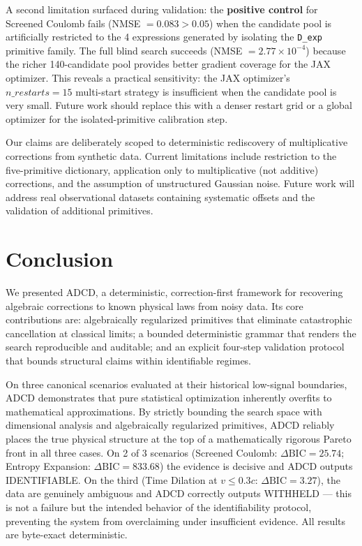 ﻿\documentclass{article}
\begin{document}
  A second limitation surfaced during validation: the \textbf{positive control} for Screened Coulomb fails (NMSE $= 0.083 > 0.05$) when the candidate pool is artificially restricted to the 4 expressions generated by isolating the \texttt{D\_exp} primitive family. The full blind search succeeds (NMSE $= 2.77 \times 10^{-4}$) because the richer 140-candidate pool provides better gradient coverage for the JAX optimizer. This reveals a practical sensitivity: the JAX optimizer's $n\_restarts = 15$ multi-start strategy is insufficient when the candidate pool is very small. Future work should replace this with a denser restart grid or a global optimizer for the isolated-primitive calibration step.

  Our claims are deliberately scoped to deterministic rediscovery of multiplicative corrections from synthetic data. Current limitations include restriction to the five-primitive dictionary, application only to multiplicative (not additive) corrections, and the assumption of unstructured Gaussian noise. Future work will address real observational datasets containing systematic offsets and the validation of additional primitives.

\section{Conclusion}

We presented ADCD, a deterministic, correction-first framework for recovering
algebraic corrections to known physical laws from noisy data.
Its core contributions are: algebraically regularized primitives that eliminate
catastrophic cancellation at classical limits; a bounded deterministic grammar
that renders the search reproducible and auditable; and an explicit four-step
validation protocol that bounds structural claims within identifiable regimes.

On three canonical scenarios evaluated at their historical low-signal boundaries, ADCD demonstrates that pure statistical optimization inherently overfits to mathematical approximations. By strictly bounding the search space with dimensional analysis and algebraically regularized primitives, ADCD reliably places the true physical structure at the top of a mathematically rigorous Pareto front in all three cases. On 2 of 3 scenarios (Screened Coulomb: $\Delta\mathrm{BIC} = 25.74$; Entropy Expansion: $\Delta\mathrm{BIC} = 833.68$) the evidence is decisive and ADCD outputs IDENTIFIABLE. On the third (Time Dilation at $v \le 0.3c$: $\Delta\mathrm{BIC} = 3.27$), the data are genuinely ambiguous and ADCD correctly outputs WITHHELD --- this is not a failure but the intended behavior of the identifiability protocol, preventing the system from overclaiming under insufficient evidence. All results are byte-exact deterministic.
\end{document}
